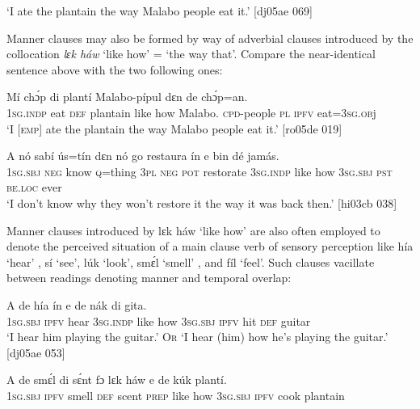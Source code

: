 \glt ‘I ate the plantain the way Malabo people eat it.’ [dj05ae 069]
\z

Manner clauses may also be formed by way of adverbial clauses introduced by the collocation \textit{lɛk háw} ‘like how’ = ‘the way that’. Compare the near-identical sentence above with the two following ones:


\ea%
    \label{ex:key:1481}
    \gll Mí    chɔ́p  di  plantí        Malabo-pípul      dɛn  de  chɔ́p=an.\\
\textsc{1sg.indp}   eat \textsc{def}   plantain  like  how    Malabo. {\textsc{cpd}{}-people} \textsc{pl}  \textsc{ipfv}  eat=3\textsc{sg.ob}j\\

\glt ‘I \textsc{[emp]} ate the plantain the way Malabo people eat it.’ [ro05de 019]
\z


\ea%
    \label{ex:key:1482}
    \gll A    nó  sabí    ús=tín  dɛn  nó  go  restaura    ín
     e    bin  dé    jamás.\\
\textsc{1sg.sbj}  \textsc{neg}  know  \textsc{q}=thing  \textsc{3pl}  \textsc{neg}  \textsc{pot}  restorate    \textsc{3sg.indp}
like  how    \textsc{3sg.sbj}  \textsc{pst}  \textsc{be.loc}  ever\\

\glt ‘I don’t know why they won’t restore it the way it was back then.’ [hi03cb 038]
\z

Manner clauses introduced by lɛk háw ‘like how’ are also often employed to denote the perceived situation of a main clause verb of sensory perception like hía ‘hear’ , sí ‘see’, lúk ‘look’, smɛ́l ‘smell’ , and fíl ‘feel’. Such clauses vacillate between readings denoting manner and temporal overlap:


\ea%
    \label{ex:key:1483}
    \gll A    de  hía  ín          e    de  nák  di  gita.\\
\textsc{1sg.sbj}  \textsc{ipfv}  hear  \textsc{3sg.indp}  like  how    \textsc{3sg.sbj}  \textsc{ipfv}  hit  \textsc{def}  guitar\\

\glt ‘I hear him playing the guitar.’ \textsc{Or} ‘I hear (him) how he’s playing the guitar.’ [dj05ae 053]
\z


\ea%
    \label{ex:key:1484}
    \gll A    de  smɛ́l    di  sɛ́nt    fɔ  lɛk  háw    e    de  kúk    plantí.\\
\textsc{1sg.sbj}  \textsc{ipfv}  smell  \textsc{def}  scent  \textsc{prep}  like  how    \textsc{3sg.sbj}  \textsc{ipfv}  cook  plantain\\

